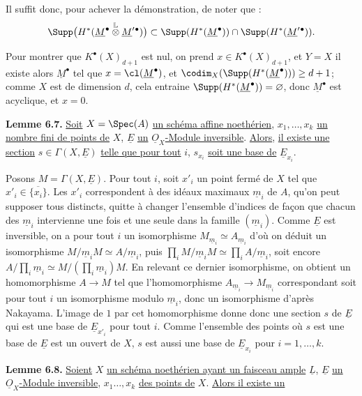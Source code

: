 
Il suffit donc, pour achever la démonstration, de noter que :
\[
\Supp\bigl(H^*(\underline{M}^\bullet\overset{\mathbb L}{\otimes}\underline{M}'{}^\bullet)\bigr)
 \subset \Supp(H^*(\underline{M}^\bullet))\cap\Supp(H^*(\underline{M}'{}^\bullet)).
\]

Pour montrer que $K^{\bullet}(X)_{d+1}$ est nul, on prend $x\in K^{\bullet}(X)_{d+1}$, et $Y=X$ il existe alors $\underline{M}^\bullet$ tel que $x=\cl(\underline{M}^\bullet)$, et $\codim_X(\Supp(H^*(\underline{M}^\bullet)))\ge d+1$; comme $X$ est de dimension $d$, cela entraine $\Supp(H^*(\underline{M}^\bullet))=\varnothing$, donc $\underline{M}^\bullet$ est acyclique, et $x=0$.

\textbf{Lemme 6.7.} \uline{Soit} $X=\Spec(A)$ \uline{un schéma affine noethérien}, $x_1,\ldots,x_k$ \uline{un nombre fini de points de} $X$, $\underline{E}$ \uline{un} $\underline{O}_X$\uline{-Module inversible}. \uline{Alors}, \uline{il existe une section} $s\in\Gamma(X,\underline{E})$ \uline{telle que pour tout} $i$, $s_{x_i}$ \uline{soit une base de} $\underline{E}_{x_i}$.

Posons $M=\Gamma(X,\underline{E})$. Pour tout $i$, soit $x'_i$ un point fermé de $X$ tel que $x'_i\in\overline{\{x_i\}}$. Les $x'_i$ correspondent à des idéaux maximaux $\underline{m}_i$ de $A$, qu'on peut supposer tous distincts, quitte à changer l'ensemble d'indices de façon que chacun des $\underline{m}_i$ intervienne une fois et une seule dans la famille $(\underline{m}_i)$. Comme $\underline{E}$ est inversible, on a pour tout $i$ un isomorphisme $M_{\underline{m}_i}\simeq A_{\underline{m}_i}$ d'où on déduit un isomorphisme $M/\underline{m}_iM\simeq A/\underline{m}_i$, puis $\prod_i M/\underline{m}_iM\simeq\prod_i A/\underline{m}_i$, soit encore $A/\prod_i\underline{m}_i\simeq M/(\prod_i\underline{m}_i)M$. En relevant ce dernier isomorphisme, on obtient un homomorphisme $A\to M$ tel que l'homomorphisme $A_{\underline{m}_i}\to M_{\underline{m}_i}$ correspondant soit pour tout $i$ un isomorphisme modulo $\underline{m}_i$, donc un isomorphisme d'après Nakayama. L'image de $1$ par cet homomorphisme donne donc une section $s$ de $\underline{E}$ qui est une base de $\underline{E}_{x'_i}$ pour tout $i$. Comme l'ensemble des points où $s$ est une base de $\underline{E}$ est un ouvert de $X$, $s$ est aussi une base de $\underline{E}_{x_i}$ pour $i=1,\ldots,k$.

\textbf{Lemme 6.8.} \uline{Soient} $X$ \uline{un schéma noethérien ayant un faisceau ample} $\underline{L}$, $\underline{E}$ \uline{un} $\underline{O}_X$\uline{-Module inversible}, $x_1\ldots,x_k$ \uline{des points de} $X$. \uline{Alors il existe un}
